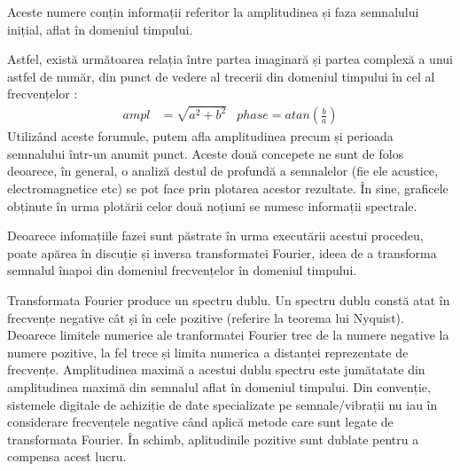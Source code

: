 \documentclass[a4paper,12pt]{report}
\begin{document}
	Aceste numere conțin informații referitor la amplitudinea și faza semnalului inițial, aflat în domeniul timpului.
	
	Astfel, există următoarea relația între partea imaginară și partea complexă a unui astfel de număr, din punct de vedere al trecerii din domeniul timpului în cel al frecvențelor :
	\begin{align}
		\label{ft_amplitude_phase}
		ampl &= \sqrt{a^2 + b^2} &  phase = atan(\frac{b}{a})
	\end{align}
	Utilizând aceste forumule, putem afla amplitudinea precum și perioada semnalului într-un anumit punct. Aceste două concepete ne sunt de folos deoarece, în general, o analiză destul de profundă a semnalelor (fie ele acustice, electromagnetice etc) se pot face prin plotarea acestor rezultate. În sine, graficele obținute în urma plotării celor două noțiuni se numesc informații spectrale.
	
	Deoarece infomațiile fazei sunt păstrate în urma executării acestui procedeu, poate apărea în discuție și inversa transformatei Fourier, ideea de a transforma semnalul înapoi din domeniul frecvențelor în domeniul timpului.

	\bigbreak
	
	Transformata Fourier produce un spectru dublu. Un spectru dublu constă atat în frecvențe negative cât și în cele pozitive (referire la teorema lui Nyquist). Deoarece limitele numerice ale tranformatei Fourier trec de la numere negative la numere pozitive, la fel trece și limita numerica a distanței reprezentate de frecvențe. Amplitudinea maximă a acestui dublu spectru este jumătatate din amplitudinea maximă din semnalul aflat în domeniul timpului. Din convenție, sistemele digitale de achiziție de date specializate pe semnale/vibrații nu iau în considerare frecvențele negative când aplică metode care sunt legate de transformata Fourier. În schimb, aplitudinile pozitive sunt dublate pentru a compensa acest lucru.
	
\end{document}
